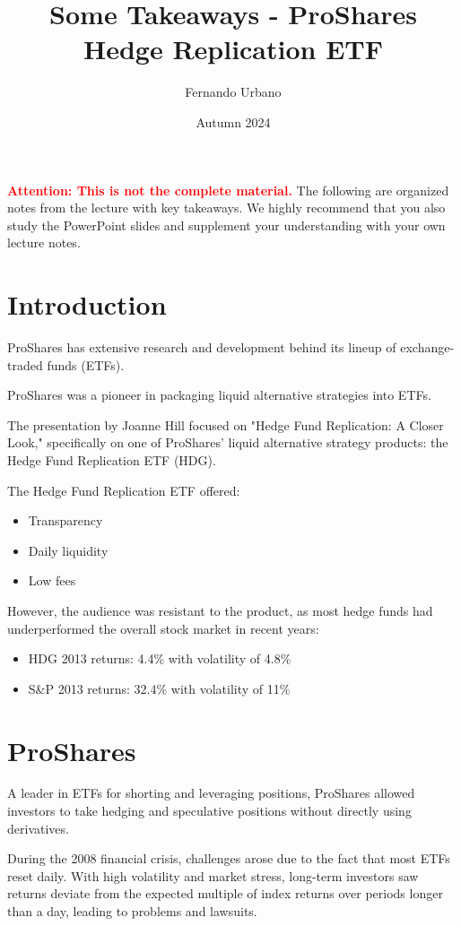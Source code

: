 \documentclass{article}
\title{Some Takeaways - ProShares Hedge Replication ETF}
\author{Fernando Urbano}
\date{Autumn 2024}
\newcommand{\redbold}[1]{\textbf{\textcolor{red}{#1}}}
\begin{document}
\maketitle

\redbold{Attention: This is not the complete material.} The following are organized notes from the lecture with key takeaways. We highly recommend that you also study the PowerPoint slides and supplement your understanding with your own lecture notes.

\section{Introduction}
ProShares has extensive research and development behind its lineup of exchange-traded funds (ETFs).

ProShares was a pioneer in packaging liquid alternative strategies into ETFs.

The presentation by Joanne Hill focused on "Hedge Fund Replication: A Closer Look," specifically on one of ProShares' liquid alternative strategy products: the Hedge Fund Replication ETF (HDG).

The Hedge Fund Replication ETF offered:
\begin{itemize}
    \item Transparency
    \item Daily liquidity
    \item Low fees
\end{itemize}

However, the audience was resistant to the product, as most hedge funds had underperformed the overall stock market in recent years:
\begin{itemize}
    \item HDG 2013 returns: 4.4\% with volatility of 4.8\%
    \item S\&P 2013 returns: 32.4\% with volatility of 11\%
\end{itemize}

\section{ProShares}
A leader in ETFs for shorting and leveraging positions, ProShares allowed investors to take hedging and speculative positions without directly using derivatives.

During the 2008 financial crisis, challenges arose due to the fact that most ETFs reset daily. With high volatility and market stress, long-term investors saw returns deviate from the expected multiple of index returns over periods longer than a day, leading to problems and lawsuits.
\end{document}
